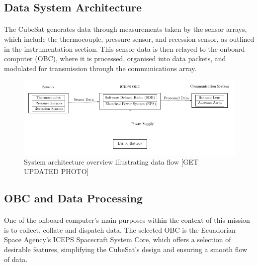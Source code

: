 \documentclass[11pt]{article}
\begin{document}
	\subsection{Data System Architecture}
	
	\paragraph{} The CubeSat generates data through measurements taken by the sensor arrays, which include the thermocouple, pressure sensor, and recession sensor, as outlined in the instrumentation section. This sensor data is then relayed to the onboard computer (OBC), where it is processed, organised into data packets, and modulated for transmission through the communications array.
	
	\begin{figure}[H]
		\centering
		\includegraphics[width=\textwidth]{SystemOverview.png}
		\caption{System architecture overview illustrating data flow [GET UPDATED PHOTO]}
	\end{figure}
	
	\subsection{OBC and Data Processing}
	
	\paragraph{}One of the onboard computer's main  purposes within the context of this mission is to collect, collate and dispatch data. The selected OBC is the Ecuadorian Space Agency's ICEPS Spacecraft System Core, which offers a selection of desirable features, simplifying the CubeSat's design and ensuring a smooth flow of data.
	
\end{document}
